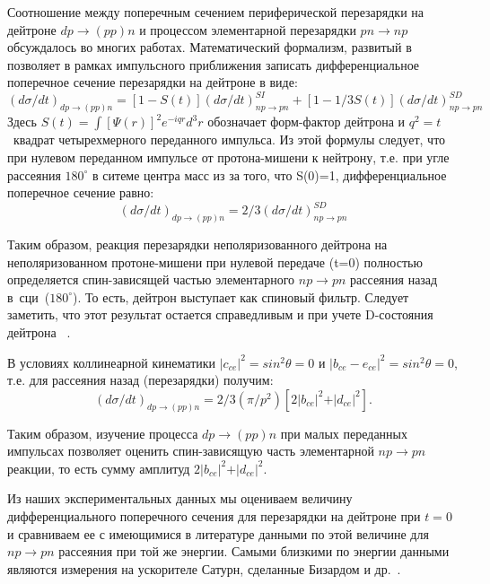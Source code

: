\documentclass[a4paper,12pt]{article}
\begin{document}
Соотношение между поперечным сечением периферической перезарядки на
дейтроне $dp \to (pp)n$ и процессом элементарной перезарядки $pn \to np$
обсуждалось во многих работах. Математический формализм, развитый
в ~\cite{a8, a9} позволяет в рамках импульсного приближения записать
дифференциальное поперечное сечение перезарядки на дейтроне в виде:
\begin{displaymath}
  (d \sigma /dt)_{dp\rightarrow(pp)n} = [1-S(t)] (d \sigma
  /dt)^{SI}_{np\rightarrow pn} + [1-1/3S(t)] (d \sigma
  /dt)^{SD}_{np\rightarrow pn}
\end{displaymath}
Здесь $S(t)= \int [\Psi(r)]^{2}e^{-iqr}d^{3}r$ обозначает форм-фактор
дейтрона и $q^2 = t$~квадрат четырехмерного переданного импульса. Из
этой формулы следует, что при нулевом переданном импульсе от
протона-мишени к нейтрону, т.е. при угле рассеяния $180^{\circ}$ в
ситеме центра масс из за того, что S(0)=1, дифференциальное поперечное
сечение равно:
\begin{displaymath}
  (d \sigma /dt)_{dp\rightarrow(pp)n} = 2/3 (d \sigma
  /dt)^{SD}_{np\rightarrow pn}
\end{displaymath}

Таким образом, реакция перезарядки неполяризованного дейтрона на
неполяризованном протоне-мишени при нулевой передаче (t=0) полностью
определяется спин-зависящей частью элементарного $np \to pn$ рассеяния
назад в~сци~($180^{\circ}$). То есть, дейтрон выступает как спиновый
фильтр. Следует заметить, что этот результат остается справедливым и
при учете D-состояния дейтрона ~\cite{a2}.

В условиях коллинеарной кинематики $\vert c_{ce}\vert ^2 = sin^2
\theta =0$ и $\vert b_{ce}-e_{ce}\vert ^2 = sin^2 \theta = 0$, т.е.
для рассеяния назад (перезарядки) получим:
\begin{displaymath}
  (d \sigma /dt)_{dp\rightarrow(pp)n} = 2/3 (\pi/p^{2})[ 2\vert b_{ce}%
    \vert ^{2}+ \vert d_{ce} \vert ^{2}].
\end{displaymath}

Таким образом, изучение процесса $dp\to (pp)n$ при малых переданных
импульсах позволяет оценить спин-зависящую часть элементарной $np\to pn$
реакции, то есть сумму амплитуд $2\vert b_{ce}\vert ^2+\vert d_{ce}\vert ^2$.

Из наших экспериментальных данных мы оцениваем величину
дифференциального поперечного сечения для перезарядки на дейтроне при
$t = 0$ и сравниваем ее с имеющимися в литературе данными по этой
величине для $np\to pn$ рассеяния при той же энергии. Самыми близкими
по энергии данными являются измерения на ускорителе Сатурн, сделанные
Бизардом и др.~\cite{a12,a13}.
\end{document}
